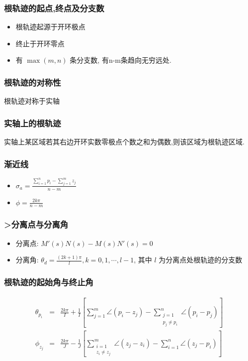 \documentclass{beamer}
\begin{document}
\begin{frame}
\frametitle{根轨迹的起点,终点及分支数}
\label{sec-2-2}

\begin{itemize}
\item 根轨迹起源于开环极点
\item 终止于开环零点
\item 有 $\max(m,n)$ 条分支数, 有n-m条趋向无穷远处.
\end{itemize}
\end{frame}
\begin{frame}
\frametitle{根轨迹的对称性}
\label{sec-2-3}

    根轨迹对称于实轴
\end{frame}
\begin{frame}
\frametitle{实轴上的根轨迹}
\label{sec-2-4}

    实轴上某区域若其右边开环实数零极点个数之和为偶数,则该区域为根轨迹区域.
\end{frame}
\begin{frame}
\frametitle{渐近线}
\label{sec-2-5}

\begin{itemize}
\item $\sigma_a =\frac{\sum_{i=1}^n p_i -\sum_{j=1}^m z_j}{n-m}$
\item $\phi = \frac{2k\pi}{n-m}$
\end{itemize}
\end{frame}
\begin{frame}
\frametitle{>分离点与分离角}
\label{sec-2-6}

\begin{itemize}
\item 分离点: $M'(s)N(s)-M(s)N'(s)=0$
\item 分离角: $\theta_d=\frac{(2k+1)\pi}{l}, k=0,1,\cdots,l-1$, 其中 $l$ 为分离点处根轨迹的分支数
\end{itemize}
\end{frame}
\begin{frame}
\frametitle{根轨迹的起始角与终止角}
\label{sec-2-7}

     \begin{eqnarray*}
     \theta_{p_i} & = & \frac{2k\pi}{I}+\frac{1}{I}\left[\sum_{j=1}^m\angle(p_i-z_j)-\sum_{\substack{j=1 \\ p_j\neq p_i}}^n\angle(p_i-p_j)\right] \\
     \phi_{z_j} & = & \frac{2k\pi}{J}-\frac{1}{J}\left[\sum_{\substack{i=1 \\ z_i\neq z_j}}^m\angle(z_j-z_i)-\sum_{i=1}^n\angle(z_j-p_i)\right] 
     \end{eqnarray*}
\end{frame}
\end{document}
